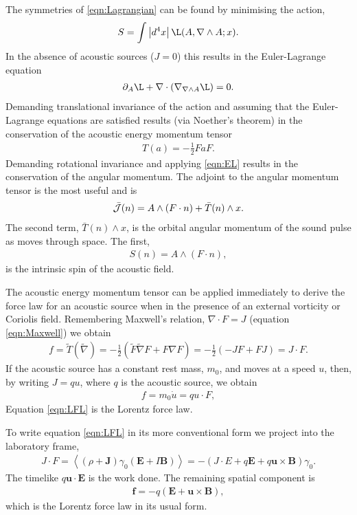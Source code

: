 \documentclass[10pt, fleqn,draft,showtrims,oldfontcommands]{article} %
\newcommand{\eqa}[1]{\begin{align}#1\end{align}}
\newcommand{\eqnref}[1]{\ref{eqn:#1}}
\newcommand{\lr}[1]{\left( #1 \right)}
\renewcommand{\d}{\partial}
\newcommand{\del}{\nabla}
\newcommand{\abs}[1]{\left| #1 \right|}
\newcommand{\scope}[1]{\tilde{#1}}
\newcommand{\half}{\tfrac{1}{2}}
\newcommand{\vf}{\vect{f}}
\newcommand{\J}{{\cal J}}
\newcommand{\vJ}{\vect J}
\newcommand{\vE}{\vect E}
\newcommand{\vB}{\vect B}
\newcommand{\adjoint}[1]{\bar{#1}}
\newcommand{\scalar}[1]{\left< #1 \right>}
\newcommand{\g}{\gamma_0}
\newcommand{\vect}[1]{\mathbf{#1}}
\newcommand{\vu}{\textbf{u}}
\begin{document}
The symmetries of \eqnref{Lagrangian} can be found by minimising the action,
\begin{align}
  S =  \int \abs{d^4x} \L(A, \del\wedge A; x).
\end{align}
In the absence of acoustic sources ($J=0$) this results in the Euler-Lagrange equation 
\begin{align}
  \d_A \L + \del \cdot  \lr{\del_{\del\wedge A}\L} = 0. \label{eqn:EL}
\end{align}
Demanding translational invariance of the action and assuming that the
Euler-Lagrange equations are satisfied results (via Noether's theorem) in the conservation of the acoustic energy momentum tensor\cite{Lasenby1993,Doran2003}  
\eqa{
   T\lr{a} = -\half F a F.
} 
Demanding rotational invariance and applying \eqnref{EL} results in the conservation of the angular momentum.
The adjoint to the angular momentum tensor is the most useful and is\cite{Lasenby1993,Doran2003}  
\begin{align}
 \adjoint{\J}(n) = A \wedge \lr{F\cdot n} +  \adjoint{T}(n) \wedge x.
\end{align}
The second term,  $\adjoint{T}(n) \wedge x$, is the orbital angular momentum of the sound pulse as
moves through space.
The first,
\begin{align}
S(n) = A \wedge \lr{F\cdot n},
\end{align}
is the intrinsic spin of the  acoustic field.

The acoustic energy momentum tensor can be applied immediately to derive the 
 force law for an acoustic source when in the presence of an external vorticity or Coriolis field.
Remembering Maxwell's relation, $\del\cdot F = J$ (equation \eqnref{Maxwell})
we obtain 
\begin{align}
 f = \scope T(\scope \del) = -\half \lr{\scope F\scope \del F + F \del F} = -\half \lr{-JF +FJ} = J \cdot F.
\end{align}
If the acoustic source has a constant rest mass, $m_0$, and moves at a speed $u$,
then, by writing  $J = q u$, where $q$ is the acoustic source, we obtain
\begin{align}
  f = m_0 \dot u = q u \cdot F, \label{eqn:LFL}
\end{align}
Equation \eqnref{LFL}  is the Lorentz force law.

To write equation \eqnref{LFL} in its more conventional form we project into the laboratory frame,
\begin{align}
J\cdot F  = \scalar{\lr{\rho + \vJ} \g\lr{\vE+I\vB}} = -\lr{J\cdot E + q \vE + q \vu\times\vB }\g.
\end{align}
The timelike $q\vu\cdot\vE $ is the work done.
The remaining spatial component is
\begin{align}
   \vf = -q \lr{\vE + \vu \times \vB},
\end{align}
which is the Lorentz force law in its usual form.
\end{document}
